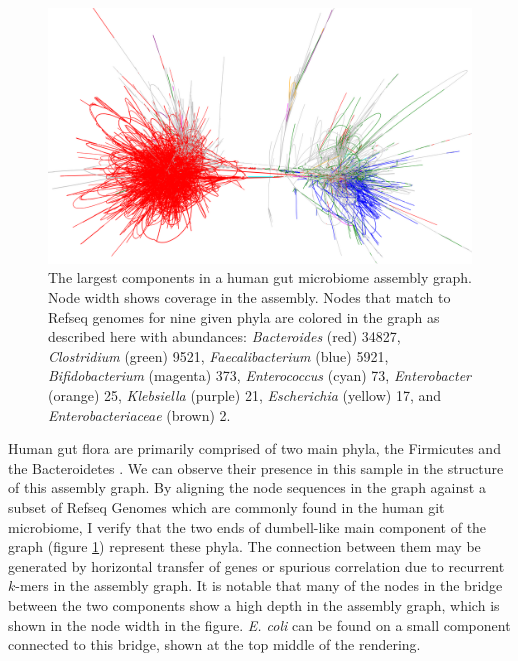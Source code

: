 \begin{figure}[htbp!]
  \centering
  \includegraphics[width=1.0\textwidth]{Chapter3/Figs/human_gut_microbiome_phyla_colored_full_between.png}
  \caption[A human gut microbiome]{
    The largest components in a human gut microbiome assembly graph.
    Node width shows coverage in the assembly.
    Nodes that match to Refseq genomes for nine given phyla are colored in the graph as described here with abundances: \emph{Bacteroides} (red) 34827, \emph{Clostridium} (green) 9521, \emph{Faecalibacterium} (blue) 5921, \emph{Bifidobacterium} (magenta) 373, \emph{Enterococcus} (cyan) 73, \emph{Enterobacter} (orange) 25, \emph{Klebsiella} (purple) 21, \emph{Escherichia} (yellow) 17, and \emph{Enterobacteriaceae} (brown) 2.
  }
  \label{fig:human_gut_microbiome_bandage}
\end{figure}


Human gut flora are primarily comprised of two main phyla, the Firmicutes and the Bacteroidetes \cite{mahowald2009characterizing}.
We can observe their presence in this sample in the structure of this assembly graph.
By aligning the node sequences in the graph against a subset of Refseq Genomes which are commonly found in the human git microbiome, I verify that the two ends of dumbell-like main component of the graph (figure \ref{fig:human_gut_microbiome_bandage}) represent these phyla.
The connection between them may be generated by horizontal transfer of genes or spurious correlation due to recurrent $k$-mers in the assembly graph.
It is notable that many of the nodes in the bridge between the two components show a high depth in the assembly graph, which is shown in the node width in the figure.
\emph{E. coli} can be found on a small component connected to this bridge, shown at the top middle of the rendering.

